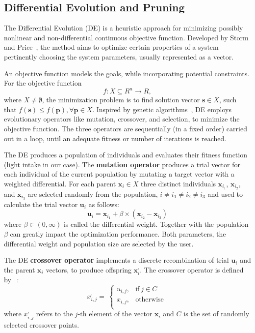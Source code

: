 \subsection{Differential Evolution and Pruning}
The Differential Evolution (DE) is a heuristic approach for minimizing possibly nonlinear and non-differential continuous objective function. Developed by Storm and Price~\cite{storn_differential_1997}, the method aims to optimize certain properties of a system pertinently choosing the system parameters, usually represented as a vector. 

An objective function models the goals, while incorporating potential constraints. For the objective function 
\begin{equation}
f:X \subseteq\!R^{n}\rightarrow \!R,
\end{equation}
where $X\neq\emptyset$, the minimization problem is to find solution vector $\mathbf{s}\in X$, such that $f(\mathbf{s})\leq f(\mathbf{p}), \forall \mathbf{p}\in X$. 
Inspired by genetic algorithms~\cite{davis1991handbook}, DE employs evolutionary operators like mutation, crossover, and selection, to minimize the objective function. The three operators are sequentially (in a fixed order) carried out in a loop, until an adequate fitness or number of iterations is reached.

The DE produces a population of individuals and evaluates their fitness function (light intake in our case). The \textbf{mutation operator} produces a trial vector for each individual of the current population by mutating a target vector with a weighted differential. 
For each parent $\mathbf{x}_{i}\in X$ three distinct individuals $\mathbf{x}_{i_1}$,  $\mathbf{x}_{i_2}$, and $\mathbf{x}_{i_3}$ are selected randomly from the population, $i \neq i_1 \neq i_2 \neq i_3$ and used to calculate the trial vector $\mathbf{u}_i$ as follows:
\begin{equation}
    \mathbf{u}_i = \mathbf{x}_{i_1}+\beta\times (\mathbf{x}_{i_2}-\mathbf{x}_{i_3})
\end{equation}
where $\beta \in (0, \infty )$ is called the differential weight. Together with the population $\beta$ can greatly impact the optimization performance. Both parameters, the differential weight and population size are selected by the user.

The DE  \textbf{crossover operator} implements a discrete recombination of trial $\mathbf{u}_i$ and the parent $\mathbf{x}_i$ vectors, to produce offspring $\mathbf{x}^{,}_i$. The crossover operator is defined by ~\cite{engelbrecht2008computational}:
\begin{equation}
     x^{,}_{i,j} = \ \left\{ \begin{matrix}
u_{i,j}, & \mathrm{\text{if}}\ j \in C \\
x_{i,j}, & \mathrm{\text{otherwise}} \\
\end{matrix} \right.\   
\end{equation}
where $x^{,}_{i,j}$ refers to the $j$-th element of the vector $\mathbf{x}_i$ and $C$ is the set of randomly selected crossover points.

